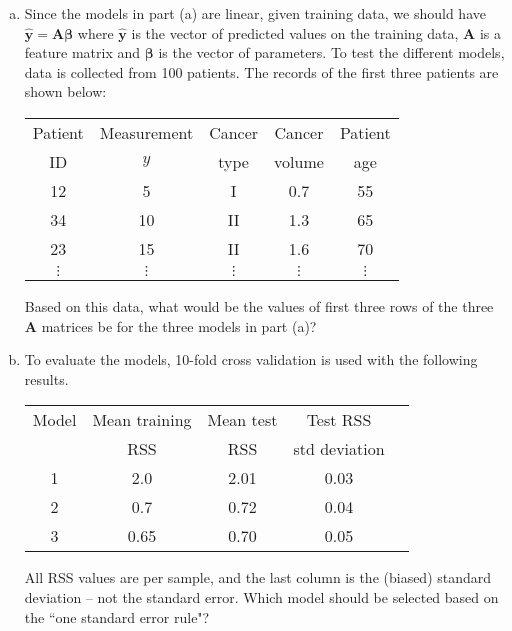 \documentclass[11pt]{article}
\newcommand{\ybf}{\mathbf{y}}
\newcommand{\Abf}{\mathbf{A}}
\def\betabf{{\boldsymbol \beta}}
\begin{document}
\begin{enumerate}
\begin{enumerate}[(a)]
  \item Since the models in part (a) are linear, given training data, 
  we should have $\hat{\ybf} = \Abf\betabf$ 
  where $\hat{\ybf}$ is the vector of predicted values on the training data,
  $\Abf$ is a feature matrix and $\betabf$ is the vector of parameters.
  To test the different models, data is collected from 100 patients.  The records of the first three patients are shown below:
\begin{center}
\begin{tabular}[h]{|c|c|c|c|c|} \hline
Patient & Measurement & Cancer & Cancer  & Patient \\
 ID &  $y$ &type & volume & age \\ \hline
12 & 5 &  I  & 0.7 & 55  \\ \hline
34 & 10 & II & 1.3 & 65  \\ \hline
23 & 15 & II & 1.6 & 70  \\ \hline
$\vdots$ & $\vdots$ & $\vdots$ & $\vdots$  & $\vdots$  \\ \hline
\end{tabular}
\end{center}
Based on this data, what would be the values of first three rows of the three
$\Abf$ matrices be for the three models in part (a)?

  \item To evaluate the models, 10-fold cross validation is used with the following results.
\begin{center}
\begin{tabular}[h]{|c|c|c|c|c|} \hline
Model & Mean training  & Mean test      & Test RSS \\
      & RSS            & RSS            & std deviation \\ \hline
1 & 2.0  & 2.01 & 0.03 \\ \hline
2 & 0.7  & 0.72 & 0.04 \\ \hline
3 & 0.65 & 0.70 & 0.05 \\ \hline
\end{tabular}
\end{center}
All RSS values are per sample, and the last column is the (biased)
standard deviation -- not the standard error.
Which model should be selected based on the ``one standard error rule"?

\end{enumerate}



\end{enumerate}
\end{document}

